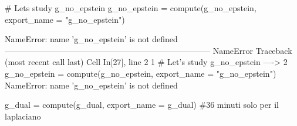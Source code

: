 \documentclass[
  italian,
  a4paper,
]{article}
\newenvironment{Shaded}{\begin{snugshade}}{\end{snugshade}}
\newcommand{\CommentTok}[1]{\textcolor[rgb]{0.37,0.37,0.37}{#1}}
\newcommand{\NormalTok}[1]{\textcolor[rgb]{0.00,0.23,0.31}{#1}}
\newcommand{\OperatorTok}[1]{\textcolor[rgb]{0.37,0.37,0.37}{#1}}
\newcommand{\StringTok}[1]{\textcolor[rgb]{0.13,0.47,0.30}{#1}}
\begin{document}
\begin{Shaded}
\begin{Highlighting}[]
\CommentTok{\# Let\textquotesingle{}s study g\_no\_epstein}
\NormalTok{g\_no\_epstein }\OperatorTok{=}\NormalTok{ compute(g\_no\_epstein, export\_name }\OperatorTok{=} \StringTok{"g\_no\_epstein"}\NormalTok{)}
\end{Highlighting}
\end{Shaded}

\begin{Highlighting}
\textcolor{black}{NameError: name 'g\_no\_epstein' is not defined}
\textcolor{black}{}\textcolor{QuartoInternalColor1}{---------------------------------------------------------------------------}\textcolor{QuartoInternalColor2}{}
\textcolor{QuartoInternalColor2}{}\textcolor{QuartoInternalColor1}{NameError}\textcolor{QuartoInternalColor2}{                                 Traceback (most recent call last)}
\textcolor{QuartoInternalColor2}{Cell }\textcolor{QuartoInternalColor3}{In[27], line 2}\textcolor{QuartoInternalColor2}{}
\textcolor{QuartoInternalColor2}{}\textcolor{QuartoInternalColor4}{      1}\textcolor{QuartoInternalColor2}{ }\textcolor{QuartoInternalColor8}{# Let's study g\_no\_epstein}\textcolor{QuartoInternalColor2}{}
\textcolor{QuartoInternalColor2}{}\textcolor{QuartoInternalColor3}{----> 2}\textcolor{QuartoInternalColor2}{ g\_no\_epstein }\textcolor{QuartoInternalColor5}{=}\textcolor{QuartoInternalColor2}{ compute(}\textcolor{QuartoInternalColor2}{g\_no\_epstein}\textcolor{QuartoInternalColor2}{, export\_name }\textcolor{QuartoInternalColor5}{=}\textcolor{QuartoInternalColor2}{ }\textcolor{QuartoInternalColor6}{"}\textcolor{QuartoInternalColor2}{}\textcolor{QuartoInternalColor6}{g\_no\_epstein}\textcolor{QuartoInternalColor2}{}\textcolor{QuartoInternalColor6}{"}\textcolor{QuartoInternalColor2}{)}
\textcolor{QuartoInternalColor2}{}\textcolor{QuartoInternalColor1}{NameError}\textcolor{QuartoInternalColor2}{: name 'g\_no\_epstein' is not defined}
\end{Highlighting}

\begin{Shaded}
\begin{Highlighting}[]
\NormalTok{g\_dual }\OperatorTok{=}\NormalTok{ compute(g\_dual, export\_name }\OperatorTok{=} \StringTok{\textquotesingle{}g\_dual\textquotesingle{}}\NormalTok{) }\CommentTok{\#36 minuti solo per il laplaciano}
\end{Highlighting}
\end{Shaded}
\end{document}
